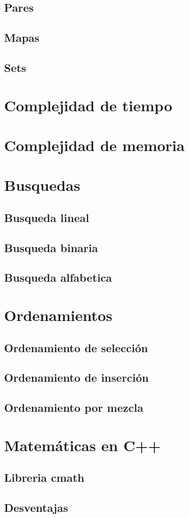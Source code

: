 \documentclass{article}
\begin{document}
\subsection{Pares}



\subsection{Mapas}

\subsection{Sets}

\section{Complejidad de tiempo}

\section{Complejidad de memoria}

\section{Busquedas}

\subsection{Busqueda lineal}

\subsection{Busqueda binaria}

\subsection{Busqueda alfabetica}

\section{Ordenamientos}

\subsection{Ordenamiento de selección}

\subsection{Ordenamiento de inserción}

\subsection{Ordenamiento por mezcla}

\section{Matemáticas en C++}

\subsection{Libreria cmath}

\subsection{Desventajas}
\end{document}
